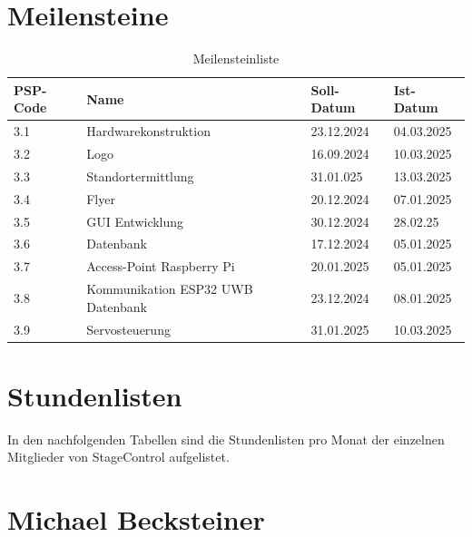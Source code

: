 \section*{Meilensteine}
\begin{table}[h]
	\centering
	\begin{tabular}{p{3cm} p{7cm} p{2cm} p{2cm}}
		\hline
		\textbf{PSP-Code} & \textbf{Name} & \textbf{Soll-Datum} & \textbf{Ist-Datum} \\
		\hline
		3.1 & Hardwarekonstruktion & 23.12.2024 & 04.03.2025 \\
		3.2 & Logo & 16.09.2024  & 10.03.2025 \\
		3.3 & Standortermittlung & 31.01.025 & 13.03.2025 \\
		3.4 & Flyer & 20.12.2024 & 07.01.2025 \\
		3.5 & GUI Entwicklung & 30.12.2024 & 28.02.25 \\
		3.6 & Datenbank & 17.12.2024 & 05.01.2025 \\
		3.7 & Access-Point Raspberry Pi & 20.01.2025 & 05.01.2025 \\
		3.8 & Kommunikation ESP32 UWB Datenbank & 23.12.2024  & 08.01.2025 \\
		3.9 & Servosteuerung & 31.01.2025 & 10.03.2025 \\
		\hline
	\end{tabular}
	\caption{Meilensteinliste}
	\label{tab:Meilensteinliste}
\end{table}
\newpage

\section*{Stundenlisten}
In den nachfolgenden Tabellen sind die Stundenlisten pro Monat der einzelnen Mitglieder von StageControl aufgelistet.

\section*{Michael Becksteiner}

